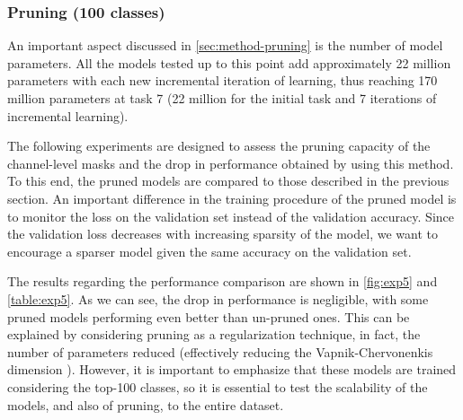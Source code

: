 \newpage
\subsubsection{Pruning (100 classes)}
An important aspect discussed in \autoref{sec:method-pruning} is the number of model parameters. All the models tested up to this point add approximately 22 million parameters with each new incremental iteration of learning, thus reaching 170 million parameters at task 7 (22 million for the initial task and 7 iterations of incremental learning).

The following experiments are designed to assess the pruning capacity of the channel-level masks and the drop in performance obtained by using this method. To this end, the pruned models are compared to those described in the previous section. An important difference in the training procedure of the pruned model is to monitor the loss on the validation set instead of the validation accuracy. Since the validation loss decreases with increasing sparsity of the model, we want to encourage a sparser model given the same accuracy on the validation set.

The results regarding the performance comparison are shown in \autoref{fig:exp5} and \autoref{table:exp5}. As we can see, the drop in performance is negligible, with some pruned models performing even better than un-pruned ones. This can be explained by considering pruning as a regularization technique, in fact, the number of parameters reduced (effectively reducing the Vapnik-Chervonenkis dimension \cite{vapnik1999nature}). However, it is important to emphasize that these models are trained considering the top-100 classes, so it is essential to test the scalability of the models, and also of pruning, to the entire dataset.


